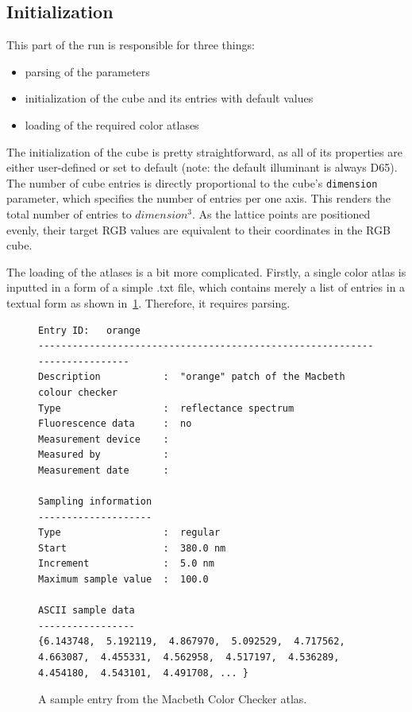 \subsection{Initialization} \label{ssec:initialization}

This part of the run is responsible for three things:
\begin{itemize}
	\item parsing of the parameters
	\item initialization of the cube and its entries with default values
	\item loading of the required color atlases
\end{itemize}

The initialization of the cube is pretty straightforward, as all of its properties are either user-defined or set to default (note: the default illuminant is always D65). The number of cube entries is directly proportional to the cube's \texttt{dimension} parameter, which specifies the number of entries per one axis. This renders the total number of entries to $dimension^3$. As the lattice points are positioned evenly, their target RGB values are equivalent to their coordinates in the RGB cube.

The loading of the atlases is a bit more complicated. Firstly, a single color atlas is inputted in a form of a simple .txt file, which contains merely a list of entries in a textual form as shown in~\cref{fig:macbethSampleText}. Therefore, it requires parsing.

\begin{figure}[t]
	\begin{lstlisting}
Entry ID:   orange
---------------------------------------------------------------------------
Description           :  "orange" patch of the Macbeth colour checker
Type                  :  reflectance spectrum
Fluorescence data     :  no
Measurement device    :  
Measured by           :  
Measurement date      :  

Sampling information
--------------------
Type	    	      :  regular
Start                 :  380.0 nm
Increment             :  5.0 nm
Maximum sample value  :  100.0

ASCII sample data
-----------------
{6.143748,  5.192119,  4.867970,  5.092529,  4.717562,  4.663087,  4.455331,  4.562958,  4.517197,  4.536289,  4.454180,  4.543101,  4.491708, ... }

	\end{lstlisting}
	\caption{A sample entry from the Macbeth Color Checker atlas.}
	\label{fig:macbethSampleText}
\end{figure}

